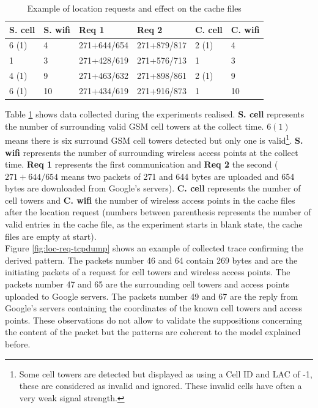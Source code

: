 \begin{table}[h]
  \centering
  \begin{tabular}[h]{ |l|l|l|l|l|l|}
    \hline
    S. cell & S. wifi & Req 1 & Req 2 & C. cell & C. wifi \\
    \hline
    6 (1)    &     4 & 271+644/654 & 271+879/817 & 2 (1) & 4 \\
    \hline
    1       &   3  & 271+428/619 & 271+576/713 & 1 & 3 \\
    \hline
    4 (1) & 9 & 271+463/632 & 271+898/861 & 2 (1) & 9 \\
    \hline
    6 (1) & 10 & 271+434/619 & 271+916/873 & 1 & 10 \\
    \hline
  \end{tabular}
  \caption{Example of location requests and effect on the cache files}
  \label{tab:expe-req-pattern}
\end{table}

Table \ref{tab:expe-req-pattern} shows data collected during the experiments realised.
\textbf{S. cell} represents the number of surrounding valid GSM cell towers at the collect time.
$6 (1)$ means there is six surround GSM cell towers detected but only one is valid\footnote{Some cell towers are detected but displayed as using a Cell ID and LAC of -1, these are considered as invalid and ignored. These invalid cells have often a very weak signal strength.}.
\textbf{S. wifi} represents the number of surrounding wireless access points at the collect time.
\textbf{Req 1} represents the first communication and \textbf{Req 2} the second ($271+644/654$ means two packets of 271 and 644 bytes are uploaded and 654 bytes are downloaded from Google's servers).
\textbf{C. cell} represents the number of cell towers and \textbf{C. wifi} the number of wireless access points in the cache files after the location request (numbers between parenthesis represents the number of valid entries in the cache file, as the experiment starts in blank state, the cache files are empty at start).\\


Figure \ref{fig:loc-req-tcpdump} shows an example of collected trace confirming the derived pattern.
The packets number 46 and 64 contain 269 bytes and are the initiating packets of a request for cell towers and wireless access points.
The packets number 47 and 65 are the surrounding cell towers and access points uploaded to Google servers.
The packets number 49 and 67 are the reply from Google's servers containing the coordinates of the known cell towers and access points.
These observations do not allow to validate the suppositions concerning the content of the packet but the patterns are coherent to the model explained before.

